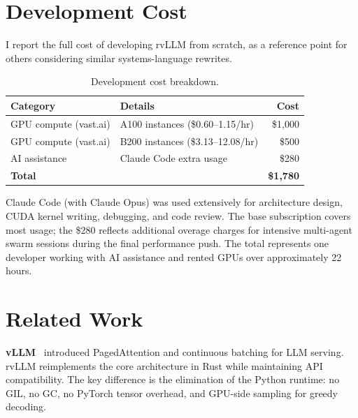 \documentclass[11pt,a4paper]{article}
\newcommand{\thead}[1]{\textbf{#1}}
\begin{document}
\section{Development Cost}
\label{sec:cost}

I report the full cost of developing rvLLM from scratch, as a reference point
for others considering similar systems-language rewrites.

\begin{table}[h]
  \centering
  \caption{Development cost breakdown.}
  \label{tab:cost}
  \small
  \begin{tabular}{@{}llr@{}}
    \toprule
    \rowcolor{HeaderBlue} \thead{Category} & \thead{Details} & \thead{Cost} \\
    \midrule
    GPU compute (vast.ai) & A100 instances (\$0.60--1.15/hr) & \$1{,}000 \\
    \rowcolor{gray!8}
    GPU compute (vast.ai) & B200 instances (\$3.13--12.08/hr) & \$500 \\
    AI assistance         & Claude Code extra usage & \$280 \\
    \midrule
    \rowcolor{gray!8}
    \textbf{Total}        &                         & \textbf{\$1{,}780} \\
    \bottomrule
  \end{tabular}
\end{table}

Claude Code (with Claude Opus) was used extensively for architecture design, CUDA
kernel writing, debugging, and code review. The base subscription covers most usage;
the \$280 reflects additional overage charges for intensive multi-agent swarm sessions
during the final performance push. The total represents one developer working with
AI assistance and rented GPUs over approximately 22 hours.

\section{Related Work}
\label{sec:related}

\textbf{vLLM}~\cite{kwon2023vllm} introduced PagedAttention and continuous batching
for LLM serving. rvLLM reimplements the core architecture in Rust while maintaining
API compatibility. The key difference is the elimination of the Python runtime:
no GIL, no GC, no PyTorch tensor overhead, and GPU-side sampling for greedy decoding.
\end{document}
